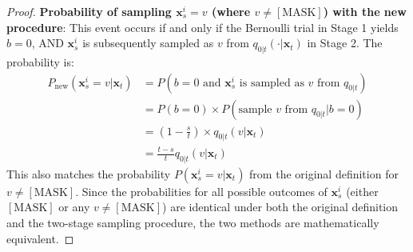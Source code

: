 \begin{proof}
\textbf{Probability of sampling $\boldsymbol{x}_s^i = v$ (where $v \neq [\text{MASK}]$) with the new procedure}:
    This event occurs if and only if the Bernoulli trial in Stage 1 yields $b=0$, AND $\boldsymbol{x}_s^i$ is subsequently sampled as $v$ from $q_{0|t}(\cdot | \boldsymbol{x}_t)$ in Stage 2. The probability is:
    \begin{align*}
    P_{\text{new}}(\boldsymbol{x}_s^i = v | \boldsymbol{x}_t) &= P(b=0 \text{ and } \boldsymbol{x}_s^i \text{ is sampled as } v \text{ from } q_{0|t}) \\
    &= P(b=0) \times P(\text{sample } v \text{ from } q_{0|t} | b=0) \\
    &= \left(1 - \frac{s}{t}\right) \times q_{0|t}(v | \boldsymbol{x}_t) \\
    &= \frac{t-s}{t} q_{0|t}(v | \boldsymbol{x}_t)
    \end{align*}
    This also matches the probability $P(\boldsymbol{x}_s^i = v | \boldsymbol{x}_t)$ from the original definition for $v \neq [\text{MASK}]$. Since the probabilities for all possible outcomes of $\boldsymbol{x}_s^i$ (either $[\text{MASK}]$ or any $v \neq [\text{MASK}]$) are identical under both the original definition and the two-stage sampling procedure, the two methods are mathematically equivalent.
\end{proof}





